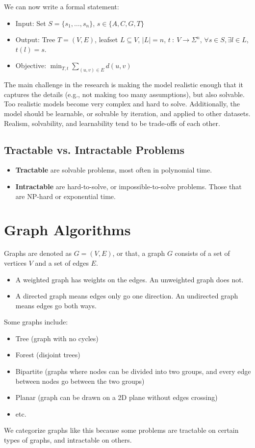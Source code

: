 \documentclass[10pt]{article}
\begin{document}
We can now write a formal statement:
\begin{itemize}
    \item Input: Set $S = \{s_1, \dots, s_n\}$, $s \in \{A, C, G, T\}$
    \item Output: Tree $T = (V, E)$, leafset $L \subseteq V$, $|L| = n$, $t \::\: V \rightarrow \Sigma^n$, $\forall s \in S, \exists l \in L$, $t(l) = s$.
    \item Objective: $\min_{T, t} \sum_{(u, v) \in E} d(u, v)$
\end{itemize}
The main challenge in the research is making the model realistic enough that it captures the details (e.g., not making too many assumptions), but also solvable.  Too realistic models become very complex and hard to solve.  Additionally, the model should be learnable, or solvable by iteration, and applied to other datasets.  Realism, solvability, and learnability tend to be trade-offs of each other.

\subsection*{Tractable vs. Intractable Problems}
\begin{itemize}
    \item \textbf{Tractable} are solvable problems, most often in polynomial time.
    \item \textbf{Intractable} are hard-to-solve, or impossible-to-solve problems.  Those that are NP-hard or exponential time.
\end{itemize}

\section*{Graph Algorithms}
Graphs are denoted as $G = (V, E)$, or that, a graph $G$ consists of a set of vertices $V$ and a set of edges $E$.
\begin{itemize}
    \item A weighted graph has weights on the edges.  An unweighted graph does not.
    \item A directed graph means edges only go one direction.  An undirected graph means edges go both ways.
\end{itemize}
Some graphs include:
\begin{itemize}
    \item Tree (graph with no cycles)
    \item Forest (disjoint trees)
    \item Bipartite (graphs where nodes can be divided into two groups, and every edge between nodes go between the two groups)
    \item Planar (graph can be drawn on a 2D plane without edges crossing)
    \item etc.
\end{itemize}
We categorize graphs like this because some problems are tractable on certain types of graphs, and intractable on others.
\end{document}
